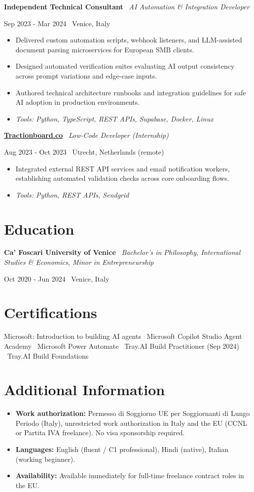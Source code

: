 \documentclass[a4paper,10pt]{article}
\newcommand{\role}[4]{%
  \vspace{2pt}\noindent
  \begin{minipage}[t]{0.70\textwidth}\raggedright\textbf{#1} \textbullet\ \textit{#3}\end{minipage}%
  \hfill
  \begin{minipage}[t]{0.28\textwidth}\raggedleft\footnotesize\color{gray}#2 \textbullet\ #4\end{minipage}%
  \vspace{1pt}%
}
\begin{document}
\role{Independent Technical Consultant}{Sep 2023 - Mar 2024}{AI Automation \& Integration Developer}{Venice, Italy}
\begin{itemize}
  \item Delivered custom automation scripts, webhook listeners, and LLM-assisted document parsing microservices for European SMB clients.
  \item Designed automated verification suites evaluating AI output consistency across prompt variations and edge-case inputs.
  \item Authored technical architecture runbooks and integration guidelines for safe AI adoption in production environments.
  \item \textit{Tools: Python, TypeScript, REST APIs, Supabase, Docker, Linux}
\end{itemize}

\role{\href{https://tractionboard.co}{Tractionboard.co}}{Aug 2023 - Oct 2023}{Low-Code Developer (Internship)}{Utrecht, Netherlands (remote)}
\begin{itemize}
  \item Integrated external REST API services and email notification workers, establishing automated validation checks across core onboarding flows.
  \item \textit{Tools: Python, REST APIs, Sendgrid}
\end{itemize}

\section{Education}
\role{Ca' Foscari University of Venice}{Oct 2020 - Jun 2024}{Bachelor's in Philosophy, International Studies \& Economics, Minor in Entrepreneurship}{Venice, Italy}

\section{Certifications}
Microsoft: Introduction to building AI agents \textbullet\ Microsoft Copilot Studio Agent Academy \textbullet\ Microsoft Power Automate \textbullet\ Tray.AI Build Practitioner (Sep 2024) \textbullet\ Tray.AI Build Foundations

\section{Additional Information}
\begin{itemize}
  \item \textbf{Work authorization:} Permesso di Soggiorno UE per Soggiornanti di Lungo Periodo (Italy), unrestricted work authorization in Italy and the EU (CCNL or Partita IVA freelance). No visa sponsorship required.
  \item \textbf{Languages:} English (fluent / C1 professional), Hindi (native), Italian (working beginner).
  \item \textbf{Availability:} Available immediately for full-time freelance contract roles in the EU.
\end{itemize}
\end{document}
